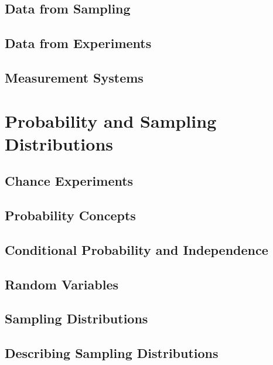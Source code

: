 \documentclass{article}
\begin{document}
	\subsection{Data from Sampling} %
	
	\subsection{Data from Experiments} %
	
	\subsection{Measurement Systems} %

\clearpage	
\section{Probability and Sampling Distributions} %

	\subsection{Chance Experiments} %
	
	\subsection{Probability Concepts} %
	
	\subsection{Conditional Probability and Independence} %
	
	\subsection{Random Variables} %
	
	\subsection{Sampling Distributions} %
	
	\subsection{Describing Sampling Distributions} %

\clearpage	 %
\end{document}
